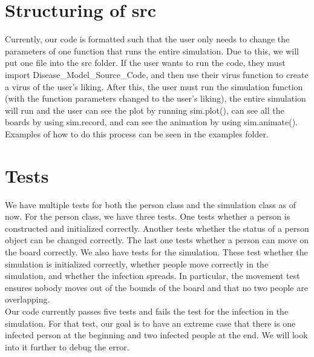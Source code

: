 \documentclass{article}
\begin{document}
\section{Structuring of src}

Currently, our code is formatted such that the user only needs to change the parameters of one function that runs the entire simulation. Due to this, we will put one file into the src folder. If the user wants to run the code, they must import Disease\_Model\_Source\_Code, and then use their virus function to create a virus of the user's liking. After this, the user must run the simulation function (with the function parameters changed to the user's liking), the entire simulation will run and the user can see the plot by running sim.plot(), can see all the boards by using sim.record, and can see the animation by using sim.animate(). Examples of how to do this process can be seen in the examples folder.

\section{Tests}

We have multiple tests for both the person class and the simulation class as of now. For the person class, we have three tests. One tests whether a person is constructed and initialized correctly. Another tests whether the status of a person object can be changed correctly. The last one tests whether a person can move on the board correctly. We also have tests for the simulation. These test whether the simulation is initialized correctly, whether people move correctly in the simulation, and whether the infection spreads. In particular, the movement test ensures nobody moves out of the bounds of the board and that no two people are overlapping. \\ Our code currently passes five tests and fails the test for the infection in the simulation. For that test, our goal is to have an extreme case that there is one infected person at the beginning and two infected people at the end. We will look into it further to debug the error.
\end{document}
